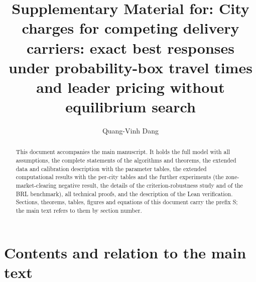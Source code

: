 \documentclass[preprint,11pt]{elsarticle}
\theoremstyle{definition}
\theoremstyle{remark}
\begin{document}
\begin{frontmatter}

\title{Supplementary Material for: City charges for competing delivery carriers: exact best responses under probability-box travel times and leader pricing without equilibrium search}

\author{Quang-Vinh Dang}
\address{British University Vietnam, Hung Yen, Vietnam. ORCID 0000-0002-3877-8024}

\begin{abstract}
This document accompanies the main manuscript. It holds the full model with all assumptions, the complete statements of the algorithms and theorems, the extended data and calibration description with the parameter tables, the extended computational results with the per-city tables and the further experiments (the zone-market-clearing negative result, the details of the criterion-robustness study and of the BRL benchmark), all technical proofs, and the description of the Lean verification. Sections, theorems, tables, figures and equations of this document carry the prefix S; the main text refers to them by section number.
\end{abstract}

\end{frontmatter}

\section*{Contents and relation to the main text}
\end{document}
